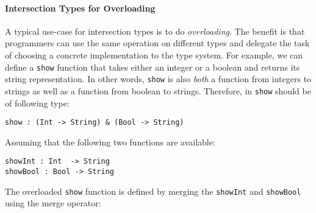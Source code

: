 \begin{comment}
The following table
summarizes the extent of support for intersection types in Java,
Scala, and \name.

\hspace{-13pt}\begin{tabular}{ l | c | c | c  }
                                   & Java       & Scala      & \name      \\ \hline
  Basic intersection types         & \checkmark & \checkmark & \checkmark \\ \hline
  Anonymous intersection types     &            & \checkmark & \checkmark \\ \hline
  Intersection of type parameters  &            & \checkmark & \checkmark \\ \hline
  Term-level intersection          &            &            & \checkmark 
\end{tabular} \\
\end{comment}


\paragraph{Intersection Types for Overloading} 
A typical use-case for intersection types is to do
\emph{overloading}. The benefit is that programmers can use the same
operation on different types and delegate the task of choosing a
concrete implementation to the type system. For example, we can define
a \lstinline{show} function that takes either an integer or a boolean
and returns its string representation. In other words, \lstinline{show} is also
\emph{both} a function from integers to strings as well as a function
from boolean to strings.  Therefore, in \name \lstinline{show} should be of
following type:
\begin{lstlisting}
show : (Int -> String) & (Bool -> String)
\end{lstlisting}
Assuming that the following two functions are available:
\begin{lstlisting}
showInt : Int  -> String 
showBool : Bool -> String
\end{lstlisting}

\noindent The overloaded \lstinline{show} function is defined by
merging the \lstinline{showInt} and \lstinline{showBool} using the
merge operator:

